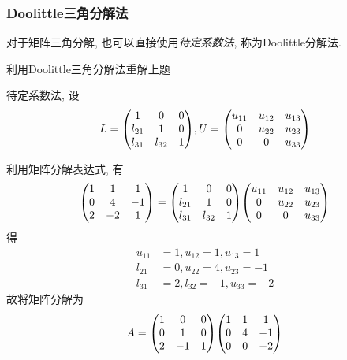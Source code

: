 \subsubsection{Doolittle三角分解法}
对于矩阵三角分解, 也可以直接使用\emph{待定系数法}, 称为Doolittle分解法.

\begin{example}
    利用Doolittle三角分解法重解上题
\end{example}

\begin{solution}
    待定系数法, 设
    \begin{equation*}
        L=\mqty(
            1&0&0\\
            l_{21}&1&0\\
            l_{31}&l_{32}&1
        ), U=\mqty(
            u_{11}&u_{12}&u_{13}\\
            0&u_{22}&u_{23}\\
            0&0&u_{33}
        )
    \end{equation*}

    利用矩阵分解表达式, 有
    \begin{equation*}
        \mqty(
            1&1&1\\
            0&4&-1\\
            2&-2&1
        )=\mqty(
            1&0&0\\
            l_{21}&1&0\\
            l_{31}&l_{32}&1
        )\mqty(
            u_{11}&u_{12}&u_{13}\\
            0&u_{22}&u_{23}\\
            0&0&u_{33}
        )
    \end{equation*}
    得
    \begin{align*}
        u_{11}&=1, u_{12}=1, u_{13}=1\\
        l_{21}&=0, u_{22}=4, u_{23}=-1\\
        l_{31}&=2, l_{32}=-1, u_{33}=-2
    \end{align*}
    故将矩阵分解为
    \begin{equation*}
        A=\mqty(
            1&0&0\\
            0&1&0\\
            2&-1&1
        )\mqty(
            1&1&1\\
            0&4&-1\\
            0&0&-2
        )
    \end{equation*}
\end{solution}

